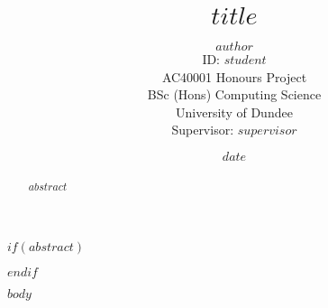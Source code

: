 \documentclass[twocolumn,twoside]{article}
\title{$title$}
\author{$author$\\ID: $student$\\AC40001 Honours Project\\BSc (Hons) Computing Science\\University of Dundee\\Supervisor: $supervisor$}
\date{$date$\vspace{5ex}}
\begin{document}
\maketitle



$if(abstract)$
\begin{abstract}
$abstract$
\end{abstract}
$endif$


$body$


\end{document}
